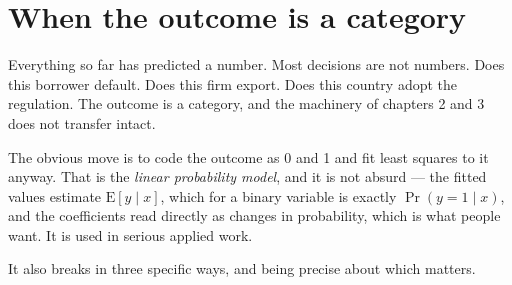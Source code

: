 \documentclass[
  letterpaper,
  10pt,
  twoside,
  openright,
  numbers=noenddot,
  chapterprefix=true]{scrbook}
\begin{document}
\section{When the outcome is a
category}\label{when-the-outcome-is-a-category}

Everything so far has predicted a number. Most decisions are not
numbers. Does this borrower default. Does this firm export. Does this
country adopt the regulation. The outcome is a category, and the
machinery of chapters 2 and 3 does not transfer intact.

The obvious move is to code the outcome as 0 and 1 and fit least squares
to it anyway. That is the \emph{linear probability model}, and it is not
absurd --- the fitted values estimate \(\mathrm{E}[y \mid x]\), which
for a binary variable is exactly \(\Pr(y = 1 \mid x)\), and the
coefficients read directly as changes in probability, which is what
people want. It is used in serious applied work.

It also breaks in three specific ways, and being precise about which
matters.
\end{document}
